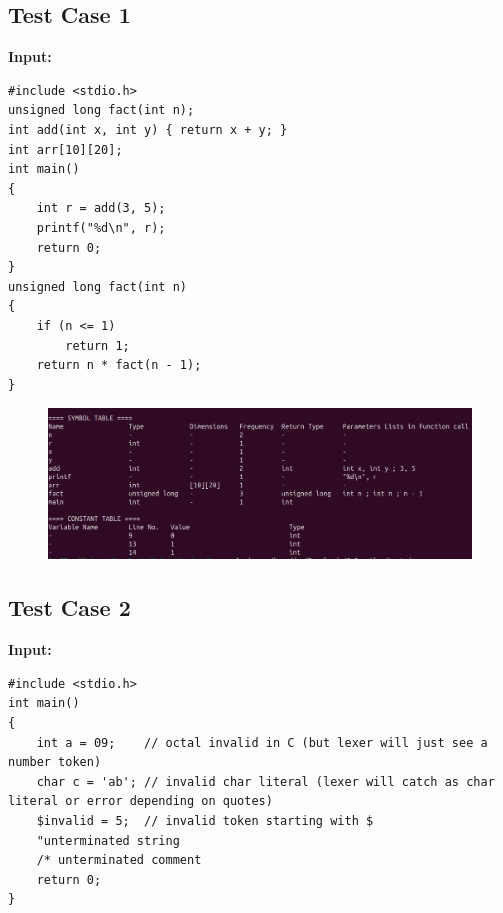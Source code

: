 \documentclass[12pt,a4paper]{article}
\begin{document}
\subsection*{Test Case 1}
\textbf{Input:}
\begin{lstlisting}[style=flex]
#include <stdio.h>
unsigned long fact(int n);
int add(int x, int y) { return x + y; }
int arr[10][20];
int main()
{
    int r = add(3, 5);
    printf("%d\n", r);
    return 0;
}
unsigned long fact(int n)
{
    if (n <= 1)
        return 1;
    return n * fact(n - 1);
}
\end{lstlisting}

\begin{figure}[H]
    \centering
    \includegraphics[width=0.9\linewidth]{functions.png}
\end{figure}

\subsection*{Test Case 2}
\textbf{Input:}
\begin{lstlisting}[style=flex]
#include <stdio.h>
int main()
{
    int a = 09;    // octal invalid in C (but lexer will just see a number token)
    char c = 'ab'; // invalid char literal (lexer will catch as char literal or error depending on quotes)
    $invalid = 5;  // invalid token starting with $
    "unterminated string
    /* unterminated comment
    return 0;
}
\end{lstlisting}
\end{document}
